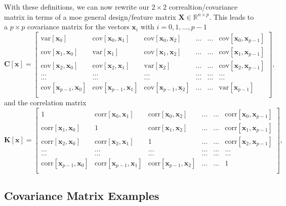 \documentclass[%
oneside,                 %
final,                   %
10pt]{article}
\begin{document}
With these definitions, we can now rewrite our $2\times 2$ correaltion/covariance matrix in terms of a moe general design/feature matrix $\bm{X}\in {\mathbb{R}}^{n\times p}$. This leads to a $p\times p$ covariance matrix for the vectors $\bm{x}_i$ with $i =0,1,\dots,p-1$
\[
\bm{C}[\bm{x}] = \begin{bmatrix}
\mathrm{var}[\bm{x}_0] & \mathrm{cov}[\bm{x}_0,\bm{x}_1]  & \mathrm{cov}[\bm{x}_0,\bm{x}_2] & \dots & \dots & \mathrm{cov}[\bm{x}_0,\bm{x}_{p-1}]\\
\mathrm{cov}[\bm{x}_1,\bm{x}_0] & \mathrm{var}[\bm{x}_1]  & \mathrm{cov}[\bm{x}_1,\bm{x}_2] & \dots & \dots & \mathrm{cov}[\bm{x}_1,\bm{x}_{p-1}]\\
\mathrm{cov}[\bm{x}_2,\bm{x}_0]   & \mathrm{cov}[\bm{x}_2,\bm{x}_1] & \mathrm{var}[\bm{x}_2] & \dots & \dots & \mathrm{cov}[\bm{x}_2,\bm{x}_{p-1}]\\
\dots & \dots & \dots & \dots & \dots & \dots \\
\dots & \dots & \dots & \dots & \dots & \dots \\
\mathrm{cov}[\bm{x}_{p-1},\bm{x}_0]   & \mathrm{cov}[\bm{x}_{p-1},\bm{x}_1] & \mathrm{cov}[\bm{x}_{p-1},\bm{x}_{2}]  & \dots & \dots  & \mathrm{var}[\bm{x}_{p-1}]\\
\end{bmatrix},
\]
and the correlation matrix
\[
\bm{K}[\bm{x}] = \begin{bmatrix}
1 & \mathrm{corr}[\bm{x}_0,\bm{x}_1]  & \mathrm{corr}[\bm{x}_0,\bm{x}_2] & \dots & \dots & \mathrm{corr}[\bm{x}_0,\bm{x}_{p-1}]\\
\mathrm{corr}[\bm{x}_1,\bm{x}_0] & 1  & \mathrm{corr}[\bm{x}_1,\bm{x}_2] & \dots & \dots & \mathrm{corr}[\bm{x}_1,\bm{x}_{p-1}]\\
\mathrm{corr}[\bm{x}_2,\bm{x}_0]   & \mathrm{corr}[\bm{x}_2,\bm{x}_1] & 1 & \dots & \dots & \mathrm{corr}[\bm{x}_2,\bm{x}_{p-1}]\\
\dots & \dots & \dots & \dots & \dots & \dots \\
\dots & \dots & \dots & \dots & \dots & \dots \\
\mathrm{corr}[\bm{x}_{p-1},\bm{x}_0]   & \mathrm{corr}[\bm{x}_{p-1},\bm{x}_1] & \mathrm{corr}[\bm{x}_{p-1},\bm{x}_{2}]  & \dots & \dots  & 1\\
\end{bmatrix},
\]


\subsection{Covariance Matrix Examples}
\end{document}
